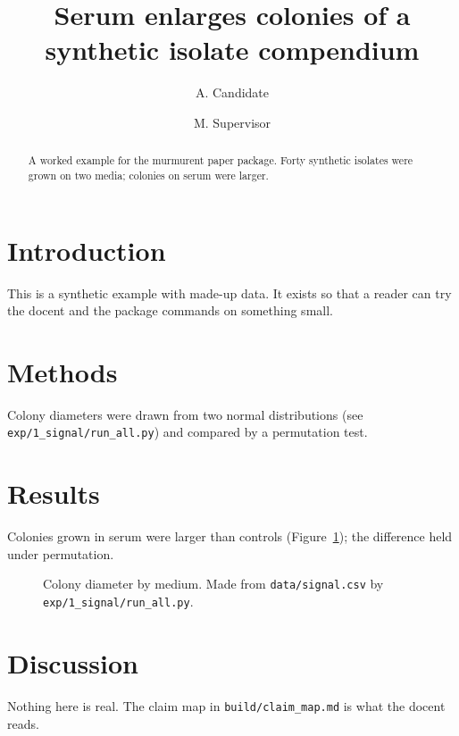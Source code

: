 \documentclass{article}
\title{Serum enlarges colonies of a synthetic isolate compendium}
\author{A. Candidate \and M. Supervisor}
\begin{document}
\maketitle
\begin{abstract}
A worked example for the murmurent paper package. Forty synthetic isolates were
grown on two media; colonies on serum were larger.
\end{abstract}

\section{Introduction}
This is a synthetic example with made-up data. It exists so that a reader can
try the docent and the package commands on something small.

\section{Methods}
Colony diameters were drawn from two normal distributions (see
\texttt{exp/1\_signal/run\_all.py}) and compared by a permutation test.

\section{Results}
Colonies grown in serum were larger than controls
(Figure~\ref{fig:signal}); the difference held under permutation.

\begin{figure}
  \centering
  \caption{Colony diameter by medium. Made from \texttt{data/signal.csv} by
  \texttt{exp/1\_signal/run\_all.py}.}
  \label{fig:signal}
\end{figure}

\section{Discussion}
Nothing here is real. The claim map in \texttt{build/claim\_map.md} is what the
docent reads.
\end{document}
